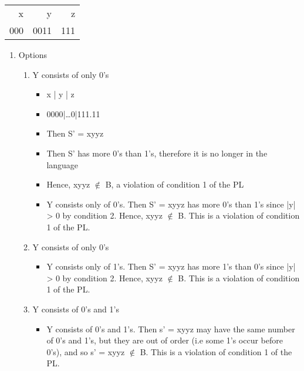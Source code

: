 \documentclass[11pt]{article}
\begin{document}
\begin{center}
\begin{tabular}{rrr}
x & y & z\\
000 & 0011 & 111\\
\end{tabular}
\end{center}
\begin{enumerate}
\item Options
\label{sec:org785946a}
\begin{enumerate}
\item Y consists of only 0's\\
\begin{itemize}
\item x   | y  | z\\
\item 0000|\ldots{}0|111.11\\
\item Then S' = xyyz\\
\item Then S' has more 0's than 1's, therefore it is no longer in the language\\
\item Hence, xyyz \(\notin\) B, a violation of condition 1 of the PL\\
\item Y consists only of 0's. Then S' = xyyz has more 0's than 1's since |y| > 0 by condition 2. Hence, xyyz \(\notin\) B. This is a violation of condition 1 of the PL.\\
\end{itemize}
\item Y consists of only 0's\\
\begin{itemize}
\item Y consists only of 1's. Then S' = xyyz has more 1's than 0's since |y| > 0 by condition 2. Hence, xyyz \(\notin\) B. This is a violation of condition 1 of the PL.\\
\end{itemize}
\item Y consists of 0's and 1's\\
\begin{itemize}
\item Y consists of 0's and 1's. Then s' = xyyz may have the same number of 0's and 1's, but they are out of order (i.e some 1's occur before 0's), and so s' = xyyz \(\notin\) B. This is a violation of condition 1 of the PL.\\
\end{itemize}
\end{enumerate}
\end{enumerate}
\end{document}
